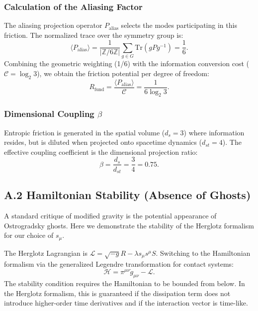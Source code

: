 \documentclass[12pt, a4paper]{article}
\theoremstyle{plain}
\theoremstyle{definition}
\begin{document}
\subsubsection{Calculation of the Aliasing Factor}
The aliasing projection operator $P_{\text{alias}}$ selects the modes participating in this friction. The normalized trace over the symmetry group is:
\begin{equation}
\langle P_{\text{alias}} \rangle = \frac{1}{|\mathbb{Z}/6\mathbb{Z}|} \sum_{g \in G} \text{Tr}(g P g^{-1}) = \frac{1}{6}.
\end{equation}
Combining the geometric weighting (1/6) with the information conversion cost ($\mathcal{C} = \log_2 3$), we obtain the friction potential per degree of freedom:
\begin{equation}
R_{\text{fund}} = \frac{\langle P_{\text{alias}} \rangle}{\mathcal{C}} = \frac{1}{6 \log_2 3}.
\end{equation}

\subsubsection{Dimensional Coupling \texorpdfstring{$\beta$}{beta}}
Entropic friction is generated in the spatial volume ($d_s=3$) where information resides, but is diluted when projected onto spacetime dynamics ($d_{st}=4$). The effective coupling coefficient is the dimensional projection ratio:
\begin{equation}
\beta = \frac{d_s}{d_{st}} = \frac{3}{4} = 0.75.
\end{equation}

\subsection{A.2 Hamiltonian Stability (Absence of Ghosts)}
\label{app:stability}

A standard critique of modified gravity is the potential appearance of Ostrogradsky ghosts. Here we demonstrate the stability of the Herglotz formalism for our choice of $s_\mu$.

The Herglotz Lagrangian is $\mathcal{L} = \sqrt{-g}R - \lambda s_\mu s^\mu S$. Switching to the Hamiltonian formalism via the generalized Legendre transformation for contact systems:
\begin{equation}
\mathcal{H} = \pi^{\mu\nu} \dot{g}_{\mu\nu} - \mathcal{L}.
\end{equation}
The stability condition requires the Hamiltonian to be bounded from below. In the Herglotz formalism, this is guaranteed if the dissipation term does not introduce higher-order time derivatives and if the interaction vector is time-like.
\end{document}
